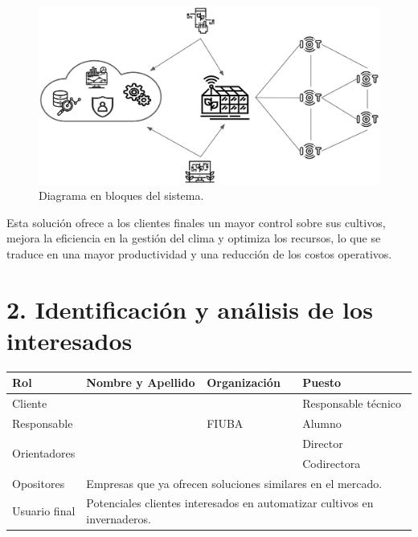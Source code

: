 \documentclass[
11pt, %
codirector, %
]{charter}
\begin{document}
\begin{figure}[htpb]
	\centering
	\includegraphics[width=.85\textwidth]{./Figuras/figura1.png}
	\caption{Diagrama en bloques del sistema.}
	\label{fig:diagBloques}
\end{figure}

Esta solución ofrece a los clientes finales un mayor control sobre sus
cultivos, mejora la eficiencia en la gestión del clima y optimiza los recursos,
lo que se traduce en una mayor productividad y una reducción de los costos
operativos.

\section{2. Identificación y análisis de los interesados}
\label{sec:interesados}

\begin{table}[ht]
	\begin{tabularx}{\linewidth}{|p{2.15cm}|p{5.8cm}|p{2.1cm}|p{4.1cm}|}
		\hline
		\rowcolor[HTML]{C0C0C0}
		Rol                           & Nombre y Apellido                                                                              & Organización    & Puesto              \\ \hline
		Cliente                       & \clientename                                                                                   & \empclientename & Responsable técnico \\ \hline
		Responsable                   & \authorname                                                                                    & FIUBA           & Alumno              \\ \hline
		\multirow{2}{*}{Orientadores} & \supname                                                                                       & \pertesupname   & Director            \\
		                              & \cosupname                                                                                     & \pertecosupname & Codirectora         \\ \hline
		Opositores                    & \multicolumn{3}{l|}{Empresas que ya ofrecen soluciones similares en el mercado.}                                                       \\ \hline
		Usuario final                 & \multicolumn{3}{l|}{Potenciales clientes interesados en automatizar cultivos en invernaderos.}                                         \\ \hline
	\end{tabularx}
\end{table}
\end{document}
